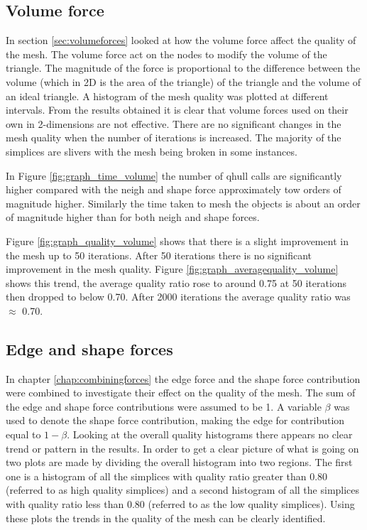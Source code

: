 \documentclass[10pt,a4paper]{book}
\begin{document}
\subsection{Volume force}
In section \ref{sec:volumeforces} looked at how the volume force affect the quality of the mesh. The volume force act on the nodes to modify the volume of the triangle. The magnitude of the force is proportional to the difference between the volume (which in 2D is the area of the triangle) of the triangle and the volume of an ideal triangle. A histogram of the mesh quality was plotted at different intervals.
From the results obtained it is clear that volume forces used on their own in 2-dimensions are not effective. There are no significant changes in the mesh quality when the number of iterations is increased. The majority of the simplices are slivers with the mesh being broken in some instances.

In Figure \ref{fig:graph_time_volume} the number of qhull calls are significantly higher compared with the neigh and shape force approximately tow orders of magnitude higher. Similarly the time taken to mesh the objects is about an order of magnitude higher than for both neigh and shape forces.

Figure \ref{fig:graph_quality_volume} shows that there is a slight improvement in the mesh up to 50 iterations. After 50 iterations there is no significant improvement in the mesh quality. Figure \ref{fig:graph_averagequality_volume} shows this trend, the average quality ratio rose to around 0.75 at 50 iterations then dropped to below 0.70. After 2000 iterations the average quality ratio was $\approx$ 0.70.

\subsection{Edge and shape forces}
In chapter \ref{chap:combiningforces} the edge force and the shape force contribution were combined to investigate their effect on the quality of the mesh. The sum of the edge and shape force contributions were assumed to be 1. A variable $\beta$ was used to denote the shape force contribution, making the edge for contribution equal to $1-\beta$.
Looking at the overall quality histograms there appears no clear trend or pattern in the results. In order to get a clear picture of what is going on two plots are made by dividing the overall histogram into two regions. The first one is a histogram of all the simplices with quality ratio greater than 0.80 (referred to as high quality simplices) and a second histogram of all the simplices with quality ratio less than 0.80 (referred to as the low quality simplices). Using these plots the trends in the quality of the mesh can be clearly identified.
\end{document}
